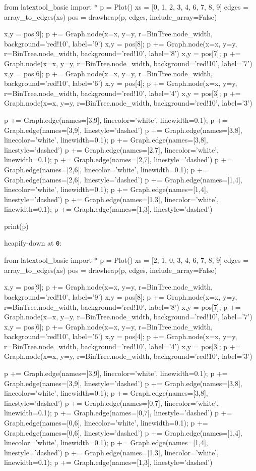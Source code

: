 
from latextool_basic import *
p = Plot()
xs = [0, 1, 2, 3, 4, 6, 7, 8, 9]
edges = array_to_edges(xs)
pos = drawheap(p, edges, include_array=False)

x,y = pos[9]; p += Graph.node(x=x, y=y, r=BinTree.node_width, background='red!10', label='9')
x,y = pos[8]; p += Graph.node(x=x, y=y, r=BinTree.node_width, background='red!10', label='8')
x,y = pos[7]; p += Graph.node(x=x, y=y, r=BinTree.node_width, background='red!10', label='7')
x,y = pos[6]; p += Graph.node(x=x, y=y, r=BinTree.node_width, background='red!10', label='6')
x,y = pos[4]; p += Graph.node(x=x, y=y, r=BinTree.node_width, background='red!10', label='4')
x,y = pos[3]; p += Graph.node(x=x, y=y, r=BinTree.node_width, background='red!10', label='3')

p += Graph.edge(names=[3,9], linecolor='white', linewidth=0.1); p += Graph.edge(names=[3,9], linestyle='dashed')
p += Graph.edge(names=[3,8], linecolor='white', linewidth=0.1); p += Graph.edge(names=[3,8], linestyle='dashed')
p += Graph.edge(names=[2,7], linecolor='white', linewidth=0.1); p += Graph.edge(names=[2,7], linestyle='dashed')
p += Graph.edge(names=[2,6], linecolor='white', linewidth=0.1); p += Graph.edge(names=[2,6], linestyle='dashed')
p += Graph.edge(names=[1,4], linecolor='white', linewidth=0.1); p += Graph.edge(names=[1,4], linestyle='dashed')
p += Graph.edge(names=[1,3], linecolor='white', linewidth=0.1); p += Graph.edge(names=[1,3], linestyle='dashed')

print(p)

heapify-down at \texttt{0}:


from latextool_basic import *
p = Plot()
xs = [2, 1, 0, 3, 4, 6, 7, 8, 9]
edges = array_to_edges(xs)
pos = drawheap(p, edges, include_array=False)

x,y = pos[9]; p += Graph.node(x=x, y=y, r=BinTree.node_width, background='red!10', label='9')
x,y = pos[8]; p += Graph.node(x=x, y=y, r=BinTree.node_width, background='red!10', label='8')
x,y = pos[7]; p += Graph.node(x=x, y=y, r=BinTree.node_width, background='red!10', label='7')
x,y = pos[6]; p += Graph.node(x=x, y=y, r=BinTree.node_width, background='red!10', label='6')
x,y = pos[4]; p += Graph.node(x=x, y=y, r=BinTree.node_width, background='red!10', label='4')
x,y = pos[3]; p += Graph.node(x=x, y=y, r=BinTree.node_width, background='red!10', label='3')

p += Graph.edge(names=[3,9], linecolor='white', linewidth=0.1); p += Graph.edge(names=[3,9], linestyle='dashed')
p += Graph.edge(names=[3,8], linecolor='white', linewidth=0.1); p += Graph.edge(names=[3,8], linestyle='dashed')
p += Graph.edge(names=[0,7], linecolor='white', linewidth=0.1); p += Graph.edge(names=[0,7], linestyle='dashed')
p += Graph.edge(names=[0,6], linecolor='white', linewidth=0.1); p += Graph.edge(names=[0,6], linestyle='dashed')
p += Graph.edge(names=[1,4], linecolor='white', linewidth=0.1); p += Graph.edge(names=[1,4], linestyle='dashed')
p += Graph.edge(names=[1,3], linecolor='white', linewidth=0.1); p += Graph.edge(names=[1,3], linestyle='dashed')

